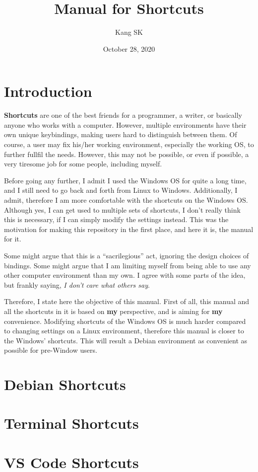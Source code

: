 \documentclass[10pt]{article}
\title{Manual for Shortcuts}
\author{Kang SK}
\date{October 28, 2020}
\begin{document}
\setlength{\parskip}{\baselineskip}

\maketitle\label{title}
\tableofcontents\label{tableofcontents}
\newpage

\section*{Introduction} \label{S_Introduction}

\textbf{Shortcuts} are one of the best friends for a programmer, a writer, or basically anyone who works with a computer.
However, multiple environments have their own unique keybindings, making users hard to distinguish between them.
Of course, a user may fix his/her working environment, especially the working OS, to further fullfil the needs.
However, this may not be possible, or even if possible, a very tiresome job for some people, including myself.

Before going any further, I admit I used the Windows OS for quite a long time, and I still need to go back and forth from Linux to Windows.
Additionally, I admit, therefore I am more comfortable with the shortcuts on the Windows OS.
Although yes, I can get used to multiple sets of shortcuts, I don't really think this is necessary, if I can simply modify the settings instead.
This was the motivation for making this repository in the first place, and here it is, the manual for it.

Some might argue that this is a ``sacrilegious'' act, ignoring the design choices of bindings.
Some might argue that I am limiting myself from being able to use any other computer environment than my own.
I agree with some parts of the idea, but frankly saying, \emph{I don't care what others say}.

Therefore, I state here the objective of this manual.
First of all, this manual and all the shortcuts in it is based on \textbf{my} perspective, and is aiming for \textbf{my} convenience.
Modifying shortcuts of the Windows OS is much harder compared to changing settings on a Linux environment, therefore this manual is closer to the Windows' shortcuts.
This will result a Debian environment as convenient as possible for pre-Window users.
\newpage


\section{Debian Shortcuts} \label{S_Debain}


\section{Terminal Shortcuts} \label{S_Terminal}


\section{VS Code Shortcuts} \label{S_VSCode}
	\begin{center}
		\begin{tabular}{@{}c c@{}}
			\toprule

			\bottomrule
		\end{tabular}
	\end{center}
\end{document}
